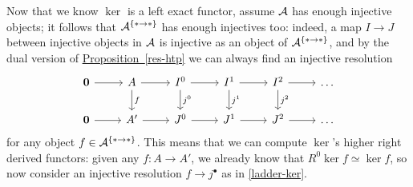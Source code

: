 \begin{ex}
    Now that we know $\ker$ is a left exact functor,
    assume $\mathcal{A}$ has enough injective objects; it follows that
    $\mathcal{A}^{\{\ast \to \ast\}}$ has enough injectives too:
    indeed, a map $I \to J$ between injective objects in $\mathcal{A}$
    is injective as an object of $\mathcal{A}^{\{\ast \to \ast\}}$,
    and by the dual version of \hyperref[res-htp]{Proposition~\ref*{res-htp}}
    we can always find an injective resolution
        \begin{equation}\label{ladder-ker}
            \begin{tikzcd}
                \cat{0} \ar[r]
                & A \ar[r] \ar[d, "f"]
                & I^{0} \ar[r] \ar[d, "j^{0}"] 
                & I^{1} \ar[r] \ar[d, "j^{1}"]
                & I^{2} \ar[r] \ar[d, "j^{2}"]
                & \dots \\
                \cat{0} \ar[r]
                & A' \ar[r] 
                & J^{0} \ar[r]  
                & J^{1} \ar[r] 
                & J^{2} \ar[r] 
                & \dots
            \end{tikzcd}
        \end{equation}
    for any object $f \in \mathcal{A}^{\{\ast \to \ast\}}$.
    This means that we can compute $\ker$'s higher right derived functors:
    given any $f : A \to A'$, 
    we already know that $R^{0}\ker f \simeq \ker f$,
    so now consider an injective resolution $f \to j^{\bullet}$
    as in \eqref{ladder-ker}.
\end{ex}
